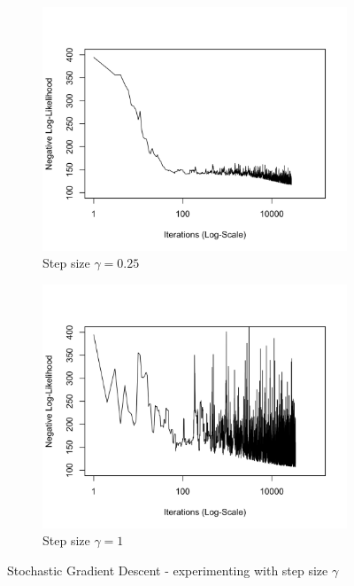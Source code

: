 \documentclass[11 pt]{article}
\begin{document}
\begin{enumerate}[label=(\Alph*)]
\begin{figure}[H]
\begin{center}
\begin{subfigure}[h]{0.45\linewidth}
			\includegraphics[width=\linewidth]{Fig/F1PC025.png}
			\caption{Step size $\gamma=0.25$}
		\end{subfigure}
		\begin{subfigure}[h]{0.45\linewidth}
			\includegraphics[width=\linewidth]{Fig/F1PC1.png}
			\caption{Step size $\gamma=1$}
		\end{subfigure}
		\caption{Stochastic Gradient Descent - experimenting with step size $\gamma$}
		\label{fig:Fig1}
	\end{center}
\end{figure}

	
	\newpage
	

\end{enumerate}
\end{document}
